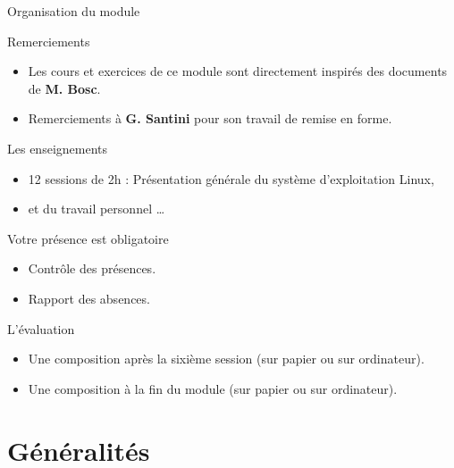 \begin{frame}{Organisation du module}
  \begin{alertblock}{Remerciements}
    \begin{itemize}
    \item Les cours et exercices de ce module sont directement inspirés
      des documents de \textbf{M. Bosc}.
    \item Remerciements à \textbf{G. Santini} pour son travail de remise
      en forme.
    \end{itemize}
  \end{alertblock}
  \begin{block}{Les enseignements}
    \begin{itemize}
    \item 12 sessions de 2h : Présentation générale du système
      d'exploitation Linux,
    \item et du travail personnel \dots
    \end{itemize}
  \end{block}
  \begin{alertblock}{Votre présence est obligatoire}
    \begin{itemize}
    \item Contrôle des présences.
    \item Rapport des absences.
    \end{itemize}
  \end{alertblock}
  \begin{block}{L'évaluation}
    \begin{itemize}
    \item Une composition après la sixième session (sur papier ou sur
      ordinateur).
    \item Une composition à la fin du module (sur papier ou sur
      ordinateur).
    \end{itemize}
  \end{block}
\end{frame}

\section{Généralités}
